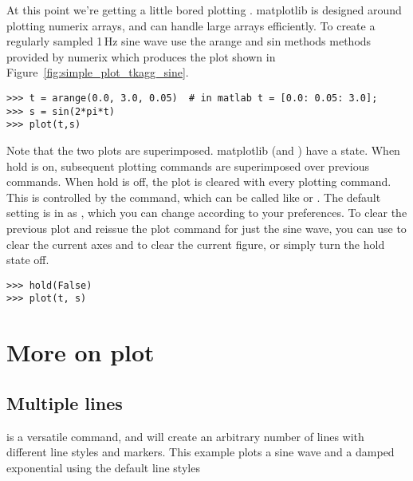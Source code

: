 \documentclass[twoside]{book}
\begin{document}

At this point we're getting a little bored plotting \code{[1,2,3]}.
matplotlib is designed around plotting numerix arrays, and can handle
large arrays efficiently.  To create a regularly sampled 1\,Hz sine
wave use the arange and sin methods methods provided by numerix which
produces the plot shown in Figure~\ref{fig:simple_plot_tkagg_sine}.

\begin{lstlisting}
>>> t = arange(0.0, 3.0, 0.05)  # in matlab t = [0.0: 0.05: 3.0];
>>> s = sin(2*pi*t)
>>> plot(t,s)
\end{lstlisting}


\noindent Note that the two plots are superimposed.  matplotlib (and
\matlab) have a  state.  When hold is on, subsequent
plotting commands are superimposed over previous commands.  When hold
is off, the plot is cleared with every plotting command.  This is
controlled by the  command, which can be called like
 or .  The default setting is in
 as , which you can change
according to your preferences.  To clear the previous plot and reissue
the plot command for just the sine wave, you can use  to
clear the current axes and  to clear the current figure, or
simply turn the hold state off.

\begin{lstlisting}
>>> hold(False)
>>> plot(t, s)
\end{lstlisting}

\section{More on plot}
\label{sec:plot}

\subsection{Multiple lines}
\label{sec:plot_multiple_lines}

 is a versatile command, and will create an arbitrary
number of lines with different line styles and markers.  This example
plots a sine wave and a damped exponential using the default line styles
\end{document}
